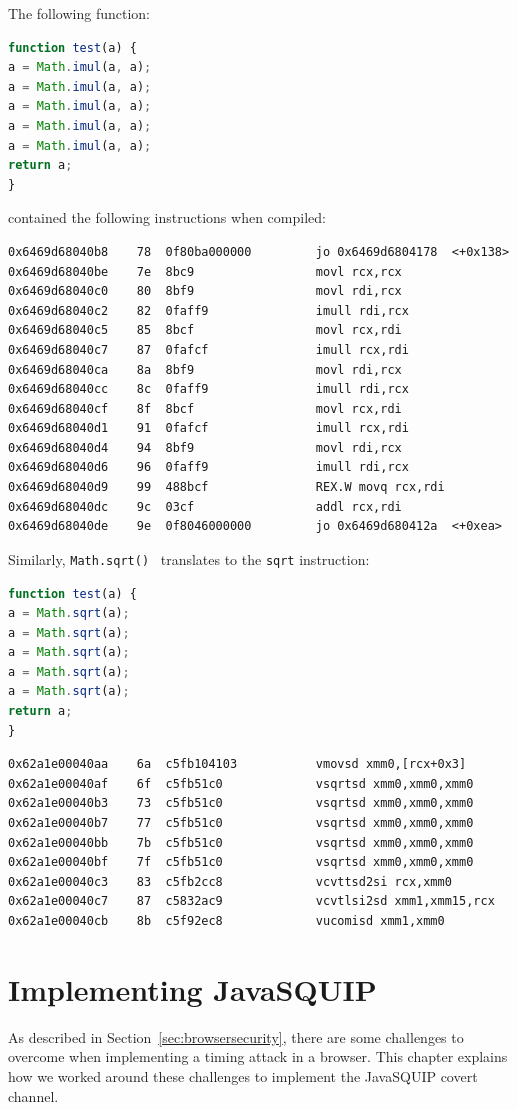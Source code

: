 \documentclass[11pt,
  titlepage=false,
]{scrreprt}
\begin{document}
The following function:
\begin{lstlisting}[language=JavaScript]
function test(a) {
a = Math.imul(a, a);
a = Math.imul(a, a);
a = Math.imul(a, a);
a = Math.imul(a, a);
a = Math.imul(a, a);
return a;
}
\end{lstlisting}
contained the following instructions when compiled:
\begin{lstlisting}
0x6469d68040b8    78  0f80ba000000         jo 0x6469d6804178  <+0x138>
0x6469d68040be    7e  8bc9                 movl rcx,rcx
0x6469d68040c0    80  8bf9                 movl rdi,rcx
0x6469d68040c2    82  0faff9               imull rdi,rcx
0x6469d68040c5    85  8bcf                 movl rcx,rdi
0x6469d68040c7    87  0fafcf               imull rcx,rdi
0x6469d68040ca    8a  8bf9                 movl rdi,rcx
0x6469d68040cc    8c  0faff9               imull rdi,rcx
0x6469d68040cf    8f  8bcf                 movl rcx,rdi
0x6469d68040d1    91  0fafcf               imull rcx,rdi
0x6469d68040d4    94  8bf9                 movl rdi,rcx
0x6469d68040d6    96  0faff9               imull rdi,rcx
0x6469d68040d9    99  488bcf               REX.W movq rcx,rdi
0x6469d68040dc    9c  03cf                 addl rcx,rdi
0x6469d68040de    9e  0f8046000000         jo 0x6469d680412a  <+0xea>
\end{lstlisting}

\pagebreak
Similarly, \texttt{Math.sqrt()}~\cite{mathsqrt} translates to the \texttt{sqrt} instruction:
\begin{lstlisting}[language=JavaScript]
function test(a) {
a = Math.sqrt(a);
a = Math.sqrt(a);
a = Math.sqrt(a);
a = Math.sqrt(a);
a = Math.sqrt(a);
return a;
}
\end{lstlisting}
\begin{lstlisting}
0x62a1e00040aa    6a  c5fb104103           vmovsd xmm0,[rcx+0x3]
0x62a1e00040af    6f  c5fb51c0             vsqrtsd xmm0,xmm0,xmm0
0x62a1e00040b3    73  c5fb51c0             vsqrtsd xmm0,xmm0,xmm0
0x62a1e00040b7    77  c5fb51c0             vsqrtsd xmm0,xmm0,xmm0
0x62a1e00040bb    7b  c5fb51c0             vsqrtsd xmm0,xmm0,xmm0
0x62a1e00040bf    7f  c5fb51c0             vsqrtsd xmm0,xmm0,xmm0
0x62a1e00040c3    83  c5fb2cc8             vcvttsd2si rcx,xmm0
0x62a1e00040c7    87  c5832ac9             vcvtlsi2sd xmm1,xmm15,rcx
0x62a1e00040cb    8b  c5f92ec8             vucomisd xmm1,xmm0
\end{lstlisting}

\pagebreak
\chapter{Implementing JavaSQUIP}
\label{ch:implementation}
As described in Section~\ref{sec:browsersecurity}, there are some challenges to overcome when implementing a timing attack in a browser.
This chapter explains how we worked around these challenges to implement the JavaSQUIP covert channel.
\end{document}
